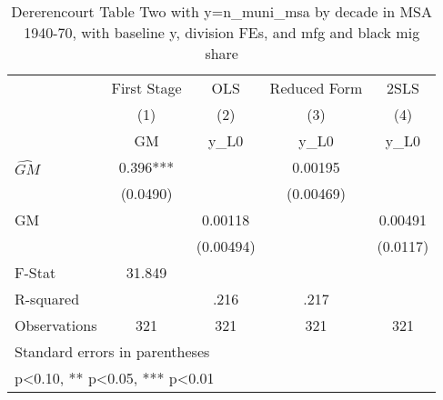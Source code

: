 \begin{table}[htbp]\centering
\def\sym#1{\ifmmode^{#1}\else\(^{#1}\)\fi}
\caption{Dererencourt Table Two with y=n\_muni\_msa by decade in MSA 1940-70, with baseline y, division FEs, and mfg and black mig share}
\begin{tabular}{l*{4}{c}}
\toprule
                    & First Stage   &         OLS   &Reduced Form   &        2SLS   \\
                    &\multicolumn{1}{c}{(1)}&\multicolumn{1}{c}{(2)}&\multicolumn{1}{c}{(3)}&\multicolumn{1}{c}{(4)}\\
                    &\multicolumn{1}{c}{GM}&\multicolumn{1}{c}{y\_L0}&\multicolumn{1}{c}{y\_L0}&\multicolumn{1}{c}{y\_L0}\\
\midrule
$\hat{GM}$          &       0.396***&               &     0.00195   &               \\
                    &    (0.0490)   &               &   (0.00469)   &               \\
\addlinespace
GM                  &               &     0.00118   &               &     0.00491   \\
                    &               &   (0.00494)   &               &    (0.0117)   \\
\midrule
F-Stat              &      31.849   &               &               &               \\
R-squared           &               &        .216   &        .217   &               \\
Observations        &         321   &         321   &         321   &         321   \\
\bottomrule
\multicolumn{5}{l}{\footnotesize Standard errors in parentheses}\\
\multicolumn{5}{l}{\footnotesize * p<0.10, ** p<0.05, *** p<0.01}\\
\end{tabular}
\end{table}
